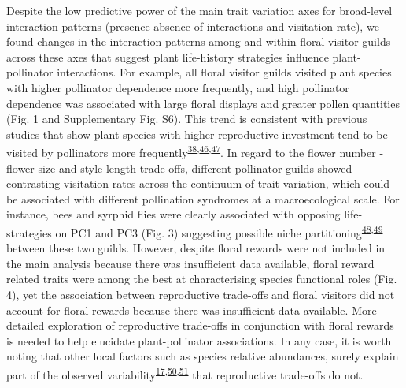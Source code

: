 \documentclass[
  12pt,
  a4paper,
]{article}
\begin{document}
Despite the low predictive power of the main trait variation axes for broad-level interaction patterns (presence-absence of interactions and visitation rate), we found changes in the interaction patterns among and within floral visitor guilds across these axes that suggest plant life-history strategies influence plant-pollinator interactions. For example, all floral visitor guilds visited plant species with higher pollinator dependence more frequently, and high pollinator dependence was associated with large floral displays and greater pollen quantities (Fig. 1 and Supplementary Fig. S6). This trend is consistent with previous studies that show plant species with higher reproductive investment tend to be visited by pollinators more frequently\textsuperscript{\protect\hyperlink{ref-lazaro2013}{38},\protect\hyperlink{ref-hegland2005}{46},\protect\hyperlink{ref-kaiser2014}{47}}. In regard to the flower number - flower size and style length trade-offs, different pollinator guilds showed contrasting visitation rates across the continuum of trait variation, which could be associated with different pollination syndromes at a macroecological scale. For instance, bees and syrphid flies were clearly associated with opposing life-strategies on PC1 and PC3 (Fig. 3) suggesting possible niche partitioning\textsuperscript{\protect\hyperlink{ref-palmer2003}{48},\protect\hyperlink{ref-phillips2020}{49}} between these two guilds. However, despite floral rewards were not included in the main analysis because there was insufficient data available, floral reward related traits were among the best at characterising species functional roles (Fig. 4), yet the association between reproductive trade-offs and floral visitors did not account for floral rewards because there was insufficient data available. More detailed exploration of reproductive trade-offs in conjunction with floral rewards is needed to help elucidate plant-pollinator associations. In any case, it is worth noting that other local factors such as species relative abundances, surely explain part of the observed variability\textsuperscript{\protect\hyperlink{ref-bartomeus2016}{17},\protect\hyperlink{ref-vazquez2007}{50},\protect\hyperlink{ref-encinas2012}{51}} that reproductive trade-offs do not.
\end{document}
